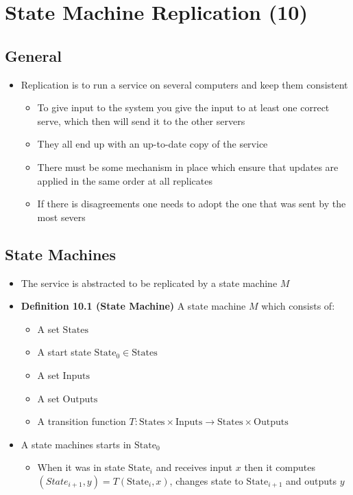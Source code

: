 \documentclass[11pt]{article}
\begin{document}
\section{State Machine Replication (10)}
\label{sec:org73497af}
\subsection{General}
\label{sec:orga166275}
\begin{itemize}
\item Replication is to run a service on several computers and keep them consistent
\begin{itemize}
\item To give input to the system you give the input to at least one correct serve, which then will send it to the other servers
\item They all end up with an up-to-date copy of the service
\item There must be some mechanism in place which ensure that updates are applied in the same order at all replicates
\item If there is disagreements one needs to adopt the one that was sent by the most severs
\end{itemize}
\end{itemize}

\subsection{State Machines}
\label{sec:org6949756}
\begin{itemize}
\item The service is abstracted to be replicated by a state machine \(M\)

\item \textbf{Definition 10.1 (State Machine)} A state machine \(M\) which consists of: 
\begin{itemize}
\item A set \(\text{States}\)
\item A start state \(\text{State}_0 \in \text{States}\)
\item A set \(\text{Inputs}\)
\item A set \(\text{Outputs}\)
\item A transition function \(T: \text{States} \times \text{Inputs} \to \text{States} \times \text{Outputs}\)
\end{itemize}
\item A state machines starts in \(\text{State}_0\)
\begin{itemize}
\item When it was in state \(\text{State}_i\) and receives input \(x\) then it computes \((State_{i+1},y)=T(\text{State}_i,x)\), changes state to \(\text{State}_{i+1}\) and outputs \(y\)
\end{itemize}
\end{itemize}
\end{document}
